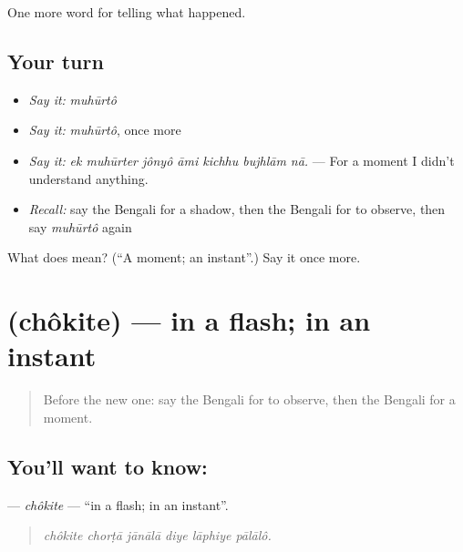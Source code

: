 \begin{grammarlens}[title={What you've built}]
One more word for telling what happened.
\end{grammarlens}

\subsection*{Your turn}
\begin{itemize}
\raggedright
  \item \emph{Say it:} \emph{muhūrtô}
  \item \emph{Say it:} \emph{muhūrtô}, once more
  \item \emph{Say it:} \emph{ek muhūrter jônyô āmi kichhu bujhlām nā.} — For a moment I didn't understand anything.
  \item \emph{Recall:} say the Bengali for a shadow, then the Bengali for to observe, then say \emph{muhūrtô} again
\end{itemize}

\begin{tcolorbox}[breakable,colback=teal!4,colframe=teal!35!black,title={Before you move on}]
What does  mean? (\textquotedblleft{}A moment; an instant\textquotedblright{}.) Say it once more.
\end{tcolorbox}
\section[\texorpdfstring{\bn{চকিতে} (chôkite)}{চকিতে (chôkite)}]{ (chôkite) — in a flash; in an instant}

\label{lesson:BN-C287-chokite}



\begin{quote}
Before the new one: say the Bengali for to observe, then the Bengali for a moment.
\end{quote}

\subsection*{You'll want to know: }
\textbf{} — \emph{chôkite} — \textquotedblleft{}in a flash; in an instant\textquotedblright{}.

\begin{quote}
     
\end{quote}

\begin{quote}
\emph{chôkite chorṭā jānālā diye lāphiye pālālô.}
\end{quote}

